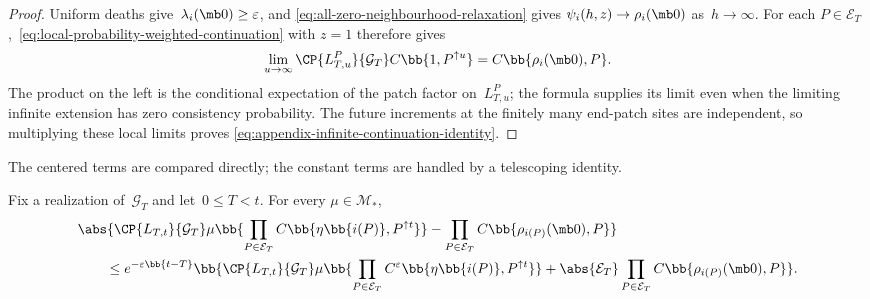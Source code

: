 \begin{proof}
Uniform deaths give~$\lambda_i(\mb 0)\geq\varepsilon$, and
\eqref{eq:all-zero-neighbourhood-relaxation} gives
$\psi_i(h,z)\to\rho_i(\mb 0)$ as~$h\to\infty$. For each
$P\in\mathcal E_T$,~\eqref{eq:local-probability-weighted-continuation} with
$z=1$ therefore gives
\begin{equation*}
\lim_{u\to\infty}
\CP{L_{T,u}^P}{\mathcal G_T}
C\bb{1,P^{\uparrow u}}
=
C\bb{\rho_i(\mb 0),P}.
\end{equation*}
The product on the left is the conditional expectation of the patch factor
on~$L_{T,u}^P$; the formula supplies its limit even when the
limiting infinite extension has zero consistency probability. The
future increments at the finitely many end-patch sites are independent, so
multiplying these local limits proves
\eqref{eq:appendix-infinite-continuation-identity}.
\end{proof}

The centered terms are compared directly; the constant terms are handled by a
telescoping identity.

\begin{lemma}
\label{lem:end-factor-relaxation}
Fix a realization of~$\mathcal G_T$ and let~$0\leq T<t$. For every
$\mu\in\mathcal M_*$,
\begin{align*}
&\abs{
 \CP{L_{T,t}}{\mathcal G_T}
 \mu\bb{
  \prod_{P\in\mathcal E_T}
  C\bb{\eta\bb{i(P)},P^{\uparrow t}}
 }
 -
\prod_{P\in\mathcal E_T}C\bb{\rho_{i(P)}(\mb 0),P}
}
\\
&\qquad\leq
e^{-\varepsilon\bb{t-T}}
\bb{
 \CP{L_{T,t}}{\mathcal G_T}
 \mu\bb{
  \prod_{P\in\mathcal E_T}
  C^\varepsilon\bb{\eta\bb{i(P)},P^{\uparrow t}}
 }
 +
 \abs{\mathcal E_T}
\prod_{P\in\mathcal E_T}C\bb{\rho_{i(P)}(\mb 0),P}
}.
\end{align*}
\end{lemma}

